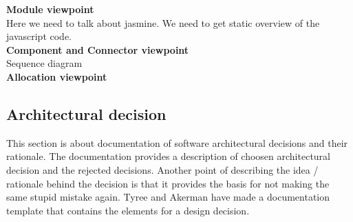 \noindent
\textbf{Module viewpoint}\\
Here we need to talk about jasmine. We need to get static overview of the javascript code.\\

\noindent
\textbf{Component and Connector viewpoint}\\
Sequence diagram\\

\noindent
\textbf{Allocation viewpoint}\\


\subsection{Architectural decision}
This section is about documentation of software architectural decisions and their rationale. The documentation provides a description of choosen architectural decision and the rejected decisions. Another point of describing the idea / rationale behind the decision is that it provides the basis for not making the same stupid mistake again. Tyree and Akerman have made a documentation template that contains the elements for a design decision.


